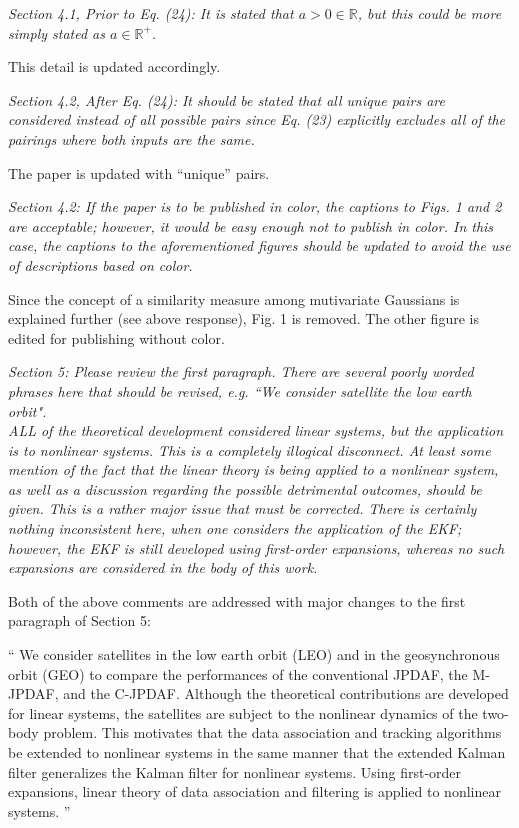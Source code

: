 \documentclass[11pt]{article}
\renewcommand{\Re}{\ensuremath{\mathbb{R}}}
\newenvironment{correction}{\begin{list}{}{\setlength{\leftmargin}{1cm}\setlength{\rightmargin}{1cm}}\vspace{\parsep}\item[]``}{''\end{list}}
\begin{document}
\begin{itemize}
\item {\itshape Section 4.1, Prior to Eq. (24):
It is stated that $a > 0 \in \Re$, but this could be more simply stated as $a \in \Re^{+}$.}

This detail is updated accordingly.

\item {\itshape Section 4.2, After Eq. (24):
It should be stated that all unique pairs are considered instead of all possible pairs since Eq. (23) explicitly excludes all of the pairings where both inputs are the same.}

The paper is updated with ``unique'' pairs.

\item {\itshape Section 4.2:
If the paper is to be published in color, the captions to Figs. 1 and 2 are acceptable; however, it would be easy enough not to publish in color.  In this case, the captions to the aforementioned figures should be updated to avoid the use of descriptions based on color.}

Since the concept of a similarity measure among mutivariate Gaussians is explained further (see above response), Fig. 1 is removed. The other figure is edited for publishing without color.

\item {\itshape Section 5:
Please review the first paragraph.  There are several poorly worded phrases here that should be revised, e.g. ``We consider satellite the low earth orbit".
\\
ALL of the theoretical development considered linear systems, but the application is to nonlinear systems.  This is a completely illogical disconnect.  At least some mention of the fact that the linear theory is being applied to a nonlinear system, as well as a discussion regarding the possible detrimental outcomes, should be given.  This is a rather major issue that must be corrected.  There is certainly nothing inconsistent here, when one considers the application of the EKF; however, the EKF is still developed using first-order expansions, whereas no such expansions are considered in the body of this work.}

Both of the above comments are addressed with major changes to the first paragraph of Section 5:

\begin{correction}
We consider satellites in the low earth orbit (LEO) and in the geosynchronous orbit (GEO) to compare the performances of the conventional JPDAF, the M-JPDAF, and the C-JPDAF.
Although the theoretical contributions are developed for linear systems, the satellites are subject to the nonlinear dynamics of the two-body problem. This motivates that the data association and tracking algorithms be extended to nonlinear systems in the same manner that the extended Kalman filter generalizes the Kalman filter for nonlinear systems. Using first-order expansions, linear theory of data association and filtering is applied to nonlinear systems.
\end{correction}


\end{itemize}
\end{document}
